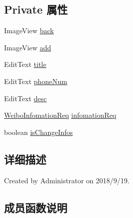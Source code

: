 \subsection*{Private 属性}
\begin{DoxyCompactItemize}
\item 
Image\+View \mbox{\hyperlink{classcom_1_1example_1_1akisame__lin_1_1love__air2_1_1_add_weibo_information_activity_a40f85aa34a56279371919fdf717ebd8a}{back}}
\item 
Image\+View \mbox{\hyperlink{classcom_1_1example_1_1akisame__lin_1_1love__air2_1_1_add_weibo_information_activity_ab93f385996f808f79b5faad0c95b8f0a}{add}}
\item 
Edit\+Text \mbox{\hyperlink{classcom_1_1example_1_1akisame__lin_1_1love__air2_1_1_add_weibo_information_activity_a3ee72a0a645813252b3b1a467fb814f2}{title}}
\item 
Edit\+Text \mbox{\hyperlink{classcom_1_1example_1_1akisame__lin_1_1love__air2_1_1_add_weibo_information_activity_a348ed972b859e103da70c90cc916ca11}{phone\+Num}}
\item 
Edit\+Text \mbox{\hyperlink{classcom_1_1example_1_1akisame__lin_1_1love__air2_1_1_add_weibo_information_activity_a31585f07b30424358cab3c069b49f459}{desc}}
\item 
\mbox{\hyperlink{classcom_1_1example_1_1akisame__lin_1_1love__air2_1_1bean1_1_1_weibo_infomation_req}{Weibo\+Infomation\+Req}} \mbox{\hyperlink{classcom_1_1example_1_1akisame__lin_1_1love__air2_1_1_add_weibo_information_activity_a7f077bcfbd3ad232b528c08267856c2c}{infomation\+Req}}
\item 
boolean \mbox{\hyperlink{classcom_1_1example_1_1akisame__lin_1_1love__air2_1_1_add_weibo_information_activity_a5e2ab10c8c3216ffa644587b41063864}{is\+Change\+Infos}}
\end{DoxyCompactItemize}


\subsection{详细描述}
Created by Administrator on 2018/9/19. 

\subsection{成员函数说明}
\mbox{\label{classcom_1_1example_1_1akisame__lin_1_1love__air2_1_1_add_weibo_information_activity_af7cb946a9becc4fb5e433c8228cae507}} 
